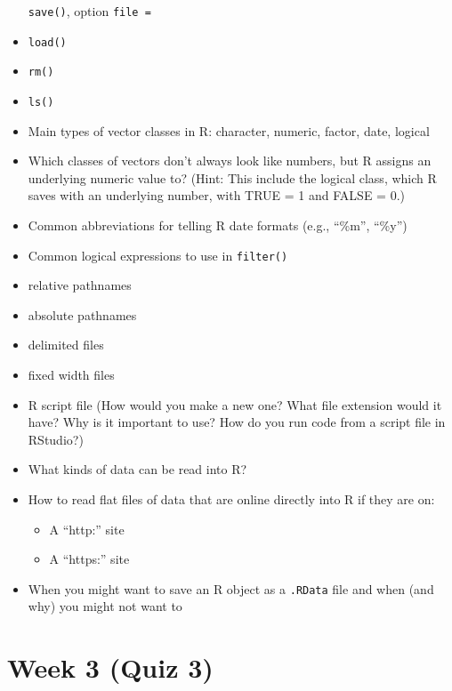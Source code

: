 \documentclass[]{book}
\providecommand{\tightlist}{%
  \setlength{\itemsep}{0pt}\setlength{\parskip}{0pt}}
\theoremstyle{definition}
\theoremstyle{definition}
\theoremstyle{definition}
\theoremstyle{remark}
\begin{document}
\begin{itemize}
  \texttt{save()}, option \texttt{file\ =}
\item
  \texttt{load()}
\item
  \texttt{rm()}
\item
  \texttt{ls()}
\item
  Main types of vector classes in R: character, numeric, factor, date,
  logical
\item
  Which classes of vectors don't always look like numbers, but R assigns
  an underlying numeric value to? (Hint: This include the logical class,
  which R saves with an underlying number, with TRUE = 1 and FALSE = 0.)
\item
  Common abbreviations for telling R date formats (e.g., ``\%m'',
  ``\%y'')
\item
  Common logical expressions to use in \texttt{filter()}
\item
  relative pathnames
\item
  absolute pathnames
\item
  delimited files
\item
  fixed width files
\item
  R script file (How would you make a new one? What file extension would
  it have? Why is it important to use? How do you run code from a script
  file in RStudio?)
\item
  What kinds of data can be read into R?
\item
  How to read flat files of data that are online directly into R if they
  are on:

  \begin{itemize}
  \tightlist
  \item
    A ``http:'' site
  \item
    A ``https:'' site
  \end{itemize}
\item
  When you might want to save an R object as a \texttt{.RData} file and
  when (and why) you might not want to
\end{itemize}

\section{Week 3 (Quiz 3)}\label{week-3-quiz-3}
\end{document}
